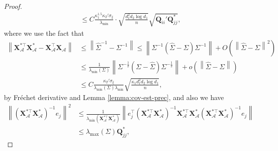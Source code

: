 \documentclass[12pt]{article}
\newcommand{\norm}[1]{\left\lVert#1\right\rVert}
\theoremstyle{plain}
\begin{document}
\begin{proof}
\begin{equation}
\begin{aligned}
    & \le C\frac{\kappa_1^{1.5} \kappa_T' \sigma_{\xi} }{ \lambda_{\min}  }\cdot \sqrt{\frac{ d_1^2 d_2 \log d_1}{n}}\sqrt{\mathbf{Q}_{ii}'\mathbf{Q}_{jj}^* },
   \end{aligned}
\end{equation}
where we use the fact that 
\begin{equation*}
\begin{aligned}
      \norm{\mathbf{X}_{\mathcal{A}}^{*\top} \mathbf{X}_{\mathcal{A}}^* - \mathbf{X}_{\mathcal{A}}^{\top} \mathbf{X}_{\mathcal{A}}}&\le \norm{\widehat{\Sigma}^{-1}-\Sigma^{-1} }\le \norm{\Sigma^{-1}(\widehat{\Sigma}-\Sigma)\Sigma^{-1}  } + O\left(\norm{\widehat{\Sigma}-\Sigma }^2 \right) \\
      & \le \frac{1}{\lambda_{\min}(\Sigma) } \norm{\Sigma^{-\frac{1}{2} }(\Sigma-\widehat{\Sigma})\Sigma^{-\frac{1}{2} }} + o\left(\norm{\widehat{\Sigma}-\Sigma } \right) \\
      & \le C\frac{\kappa_T' \sigma_\xi }{\lambda_{\min}(\Sigma)\lambda_{\min} }\sqrt{\frac{ \kappa_1  d_1^2 d_2 \log d_1 }{n}},
\end{aligned}
\end{equation*}
by Fréchet derivative \citep{higham2008functions,al2009computing} and Lemma \ref{lemma:cov-est-prec}, and also we have
\begin{equation*}
\begin{aligned}
      \norm{\left(\mathbf{X}_{\mathcal{A}}^{*\top} \mathbf{X}_{\mathcal{A}}^*\right)^{-1}e_j}^2 & \le \frac{1}{\lambda_{\min}\left(\mathbf{X}_{\mathcal{A}}^{*\top} \mathbf{X}_{\mathcal{A}}^*\right)  } \norm{ e^\top_j \left(\mathbf{X}_{\mathcal{A}}^{*\top} \mathbf{X}_{\mathcal{A}}^*\right)^{-1}\mathbf{X}_{\mathcal{A}}^{*\top} \mathbf{X}_{\mathcal{A}}^*\left(\mathbf{X}_{\mathcal{A}}^{*\top} \mathbf{X}_{\mathcal{A}}^*\right)^{-1}e_j } \\
      & \le \lambda_{\max}(\Sigma) \mathbf{Q}_{jj}^*,
\end{aligned}
\end{equation*}


\end{proof}
\end{document}
